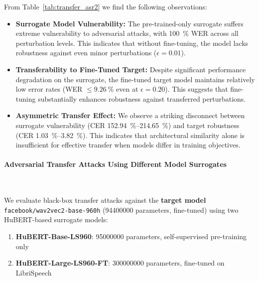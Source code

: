 \documentclass[../main.tex]{subfiles}
\begin{document}
From Table~\ref{tab:transfer_asr2} we find the following observations:
\begin{itemize}
\item \textbf{Surrogate Model Vulnerability:} The pre-trained-only surrogate suffers extreme vulnerability to adversarial attacks, with \SI{100}{\percent} WER across all perturbation levels. This indicates that without fine-tuning, the model lacks robustness against even minor perturbations (\(\epsilon=0.01\)).
\item \textbf{Transferability to Fine-Tuned Target:} Despite significant performance degradation on the surrogate, the fine-tuned target model maintains relatively low error rates (WER \(\leq \SI{9.26}{\percent}\) even at \(\epsilon=0.20\)). This suggests that fine-tuning substantially enhances robustness against transferred perturbations.
\item \textbf{Asymmetric Transfer Effect:} We observe a striking disconnect between surrogate vulnerability (CER \SIrange{152.94}{214.65}{\percent}) and target robustness (CER \SIrange{1.03}{3.82}{\percent}). This indicates that architectural similarity alone is insufficient for effective transfer when models differ in training objectives.
\end{itemize}

\paragraph{Adversarial Transfer Attacks Using Different Model Surrogates}\leavevmode\\
\label{subsec:hubert_transfer_attacks}

We evaluate black-box transfer attacks against the \textbf{target model} \texttt{facebook/wav2vec2-base-960h} (\num{94400000} parameters, fine-tuned) using two HuBERT-based surrogate models:
\begin{enumerate}
\item \textbf{HuBERT-Base-LS960}: \num{95000000} parameters, self-supervised pre-training only
\item \textbf{HuBERT-Large-LS960-FT}: \num{300000000} parameters, fine-tuned on LibriSpeech
\end{enumerate}
\end{document}
